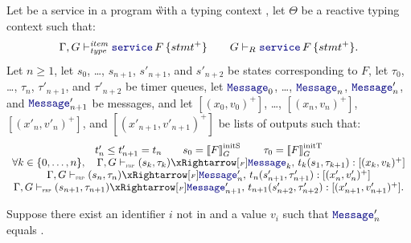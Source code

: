 \begin{skippableproof}
    Let  be a service in a program \G with a typing context \tyCtx, let
    $\Theta$ be a reactive typing context such that:
    \begin{equation*}
        \itemTyped{\service{F}{stmt^+}} \qquad \servTypedReact{\service{F}{stmt^+}}.
    \end{equation*}
    Let $n \ge 1$, let $s_0$, \dots, $s_{n+1}$, $s'_{n+1}$, and $s'_{n+2}$ be states corresponding
    to $F$, let $\tau_0$, \dots, $\tau_n$, $\tau'_{n+1}$, and $\tau'_{n+2}$ be timer
    queues, let $\mess_0$, \dots, $\mess_n$, $\mess'_n$, and $\mess'_{n+1}$ be messages, and let
    $[(x_0, v_0)^+]$, \dots, $[(x_n, v_n)^+]$, $[(x'_n, v'_n)^+]$, and $[(x'_{n+1}, v'_{n+1})^+]$ be
    lists of outputs such that:
    \begin{equation*}
        \begin{array}{c}
            t'_n \le t'_{n+1} = t_n \qquad s_0 = \initstate{F} \qquad \tau_0 = \inittimer{F}                                \\
            \forall k \in \{0, \dots, n\}, \quad \serviceOpSem{s_k}{\tau_k}{F}{\mess_k}{t_k}{s_1}{\tau_{k+1}}{(x_k, v_k)^+} \\
            \serviceOpSem{s_n}{\tau_n}{F}{\mess'_n}{t_n}{s'_{n+1}}{\tau'_{n+1}}{(x'_n, v'_n)^+}                             \\
            \serviceOpSem{s_{n+1}}{\tau_{n+1}}{F}{\mess'_{n+1}}{t_{n+1}}{s'_{n+2}}{\tau'_{n+2}}{(x'_{n+1}, v'_{n+1})^+}.
        \end{array}
    \end{equation*}

    Suppose there exist an identifier $i$ not in  and a value $v_i$ such that
    $\mess'_n$ equals .


\end{skippableproof}

